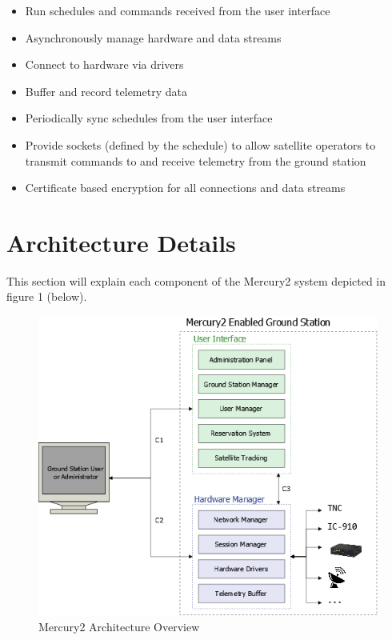 \documentclass{mxl-design}
\begin{document}
\begin{itemize}
	\item Run schedules and commands received from the user interface
	\item Asynchronously manage hardware and data streams
	\item Connect to hardware via drivers
	\item Buffer and record telemetry data
	\item Periodically sync schedules from the user interface	
	\item Provide sockets (defined by the schedule) to allow satellite operators to transmit commands to and receive telemetry from the ground station
	\item Certificate based encryption for all connections and data streams
\end{itemize}

\clearpage
\part{Architecture Details}
This section will explain each component of the Mercury2 system depicted in figure 1 (below).

\begin{figure}[hbtp]
	\centering
	\includegraphics[scale=.55]{Architecture_Diagram.png}
	\caption{Mercury2 Architecture Overview}
	\label{architecture_diagram}
\end{figure}
\end{document}
